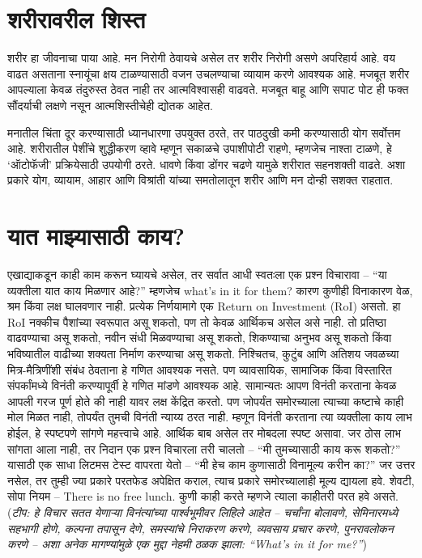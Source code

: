 \section*{शरीरावरील शिस्त}

शरीर हा जीवनाचा पाया आहे. मन निरोगी ठेवायचे असेल तर शरीर निरोगी असणे अपरिहार्य आहे. वय वाढत असताना स्नायूंचा क्षय टाळण्यासाठी वजन उचलण्याचा व्यायाम करणे आवश्यक आहे. मजबूत शरीर आपल्याला केवळ तंदुरुस्त ठेवत नाही तर आत्मविश्वासही वाढवते. मजबूत बाहू आणि सपाट पोट ही फक्त सौंदर्याची लक्षणे नसून आत्मशिस्तीचेही द्योतक आहेत.

मनातील चिंता दूर करण्यासाठी ध्यानधारणा उपयुक्त ठरते, तर पाठदुखी कमी करण्यासाठी योग सर्वोत्तम आहे. शरीरातील पेशींचे शुद्धीकरण व्हावे म्हणून सकाळचे उपाशीपोटी राहणे, म्हणजेच नाश्ता टाळणे, हे ‘ऑटोफॅजी’ प्रक्रियेसाठी उपयोगी ठरते. धावणे किंवा डोंगर चढणे यामुळे शरीरात सहनशक्ती वाढते. अशा प्रकारे योग, व्यायाम, आहार आणि विश्रांती यांच्या समतोलातून शरीर आणि मन दोन्ही सशक्त राहतात.


\section*{यात माझ्यासाठी काय?}
एखाद्याकडून काही काम करून घ्यायचे असेल, तर सर्वात आधी स्वतःला एक प्रश्न विचारावा – “या व्यक्तीला यात काय मिळणार आहे?” म्हणजेच what’s in it for them?
कारण कुणीही विनाकारण वेळ, श्रम किंवा लक्ष घालवणार नाही. प्रत्येक निर्णयामागे एक Return on Investment (RoI) असतो. हा RoI नक्कीच पैशांच्या स्वरूपात असू शकतो, पण तो केवळ आर्थिकच असेल असे नाही. तो प्रतिष्ठा वाढवण्याचा असू शकतो, नवीन संधी मिळवण्याचा असू शकतो, शिकण्याचा अनुभव असू शकतो किंवा भविष्यातील वाढीच्या शक्यता निर्माण करण्याचा असू शकतो.
निश्चितच, कुटुंब आणि अतिशय जवळच्या मित्र-मैत्रिणींशी संबंध ठेवताना हे गणित आवश्यक नसते. पण व्यावसायिक, सामाजिक किंवा विस्तारित संपर्कांमध्ये विनंती करण्यापूर्वी हे गणित मांडणे आवश्यक आहे.
सामान्यतः आपण विनंती करताना केवळ आपली गरज पूर्ण होते की नाही यावर लक्ष केंद्रित करतो. पण जोपर्यंत समोरच्याला त्याच्या कष्टाचे काही मोल मिळत नाही, तोपर्यंत तुमची विनंती न्याय्य ठरत नाही. म्हणून विनंती करताना त्या व्यक्तीला काय लाभ होईल, हे स्पष्टपणे सांगणे महत्त्वाचे आहे. आर्थिक बाब असेल तर मोबदला स्पष्ट असावा. जर ठोस लाभ सांगता आला नाही, तर निदान एक प्रश्न विचारला तरी चालतो – “मी तुमच्यासाठी काय करू शकतो?”
यासाठी एक साधा लिटमस टेस्ट वापरता येतो – “मी हेच काम कुणासाठी विनामूल्य करीन का?” जर उत्तर नसेल, तर तुम्ही ज्या प्रकारे परतफेड अपेक्षित कराल, त्याच प्रकारे समोरच्यालाही मूल्य द्यायला हवे.
शेवटी, सोपा नियम – There is no free lunch. कुणी काही करते म्हणजे त्याला काहीतरी परत हवे असते.
(\textit{टीप: हे विचार सतत येणाऱ्या विनंत्यांच्या पार्श्वभूमीवर लिहिले आहेत – चर्चांना बोलावणे, सेमिनारमध्ये सहभागी होणे, कल्पना तपासून देणे, समस्यांचे निराकरण करणे, व्यवसाय प्रचार करणे, पुनरावलोकन करणे – अशा अनेक मागण्यांमुळे एक मुद्दा नेहमी ठळक झाला: “What’s in it for me?”})










